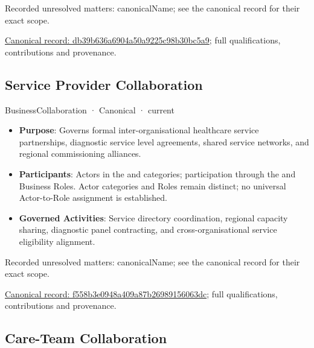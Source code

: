 {\small Recorded unresolved matters: canonicalName; see the canonical record for their exact scope.}\par
{\footnotesize \href{../../../../continuum/business/business-collaboration/db39b636a6904a50a9225c98b30bc5a9.md}{Canonical record: db39b636a6904a50a9225c98b30bc5a9}; full qualifications, contributions and provenance.}\par
\subsection{Service Provider Collaboration}

\label{element:f558b3e0948a409a87b26989156063dc}
{\small BusinessCollaboration · Canonical · current}\par

\begin{itemize}


\item \textbf{Purpose}: Governs formal inter-organisational healthcare service partnerships, diagnostic service level agreements, shared service networks, and regional commissioning alliances.

\item \textbf{Participants}: Actors in the \texttt{} and \texttt{} categories; participation through the \texttt{} and \texttt{} Business Roles. Actor categories and Roles remain distinct; no universal Actor-to-Role assignment is established.

\item \textbf{Governed Activities}: Service directory coordination, regional capacity sharing, diagnostic panel contracting, and cross-organisational service eligibility alignment.

\end{itemize}

{\small Recorded unresolved matters: canonicalName; see the canonical record for their exact scope.}\par
{\footnotesize \href{../../../../continuum/business/business-collaboration/f558b3e0948a409a87b26989156063dc.md}{Canonical record: f558b3e0948a409a87b26989156063dc}; full qualifications, contributions and provenance.}\par
\subsection{Care-Team Collaboration}

